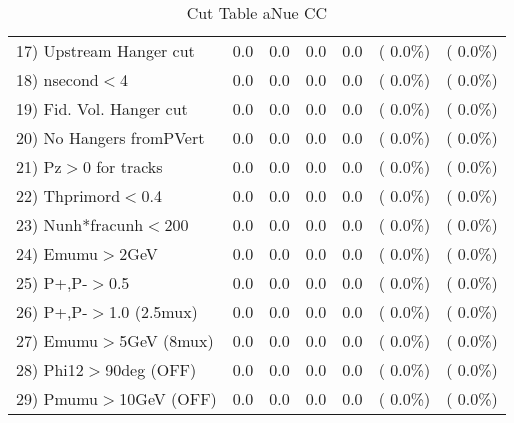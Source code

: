 \begin{table}[h!]
\begin{tabular}{||l||r|r|r|r|r|r||}
 17) Upstream Hanger cut  &          0.0 &          0.0 &          0.0 &          0.0 & (  0.0\%) & (  0.0\%) \\
 18) nsecond$<$4          &          0.0 &          0.0 &          0.0 &          0.0 & (  0.0\%) & (  0.0\%) \\
 19) Fid. Vol. Hanger cut &          0.0 &          0.0 &          0.0 &          0.0 & (  0.0\%) & (  0.0\%) \\
 20) No Hangers fromPVert &          0.0 &          0.0 &          0.0 &          0.0 & (  0.0\%) & (  0.0\%) \\
 21) Pz$>$0 for tracks    &          0.0 &          0.0 &          0.0 &          0.0 & (  0.0\%) & (  0.0\%) \\
 22) Thprimord$<$0.4      &          0.0 &          0.0 &          0.0 &          0.0 & (  0.0\%) & (  0.0\%) \\
 23) Nunh*fracunh$<$200   &          0.0 &          0.0 &          0.0 &          0.0 & (  0.0\%) & (  0.0\%) \\
 24) Emumu$>$2GeV         &          0.0 &          0.0 &          0.0 &          0.0 & (  0.0\%) & (  0.0\%) \\
 25) P+,P-$>$0.5          &          0.0 &          0.0 &          0.0 &          0.0 & (  0.0\%) & (  0.0\%) \\
 26) P+,P-$>$1.0 (2.5mux) &          0.0 &          0.0 &          0.0 &          0.0 & (  0.0\%) & (  0.0\%) \\
 27) Emumu$>$5GeV  (8mux) &          0.0 &          0.0 &          0.0 &          0.0 & (  0.0\%) & (  0.0\%) \\
 28) Phi12$>$90deg  (OFF) &          0.0 &          0.0 &          0.0 &          0.0 & (  0.0\%) & (  0.0\%) \\
 29) Pmumu$>$10GeV  (OFF) &          0.0 &          0.0 &          0.0 &          0.0 & (  0.0\%) & (  0.0\%) \\
 \hline
 \hline
 \end{tabular}
 \caption{Cut Table  aNue CC  }
 \label{tab-cutcohjpsi-mumu_anuecc}
 \end{table}
